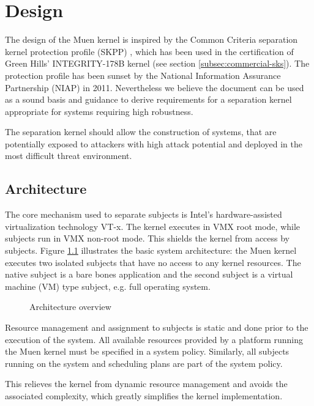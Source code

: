 \chapter{Design}
The design of the Muen kernel is inspired by the Common Criteria separation
kernel protection profile (SKPP) \cite{SKPP}, which has been used in the
certification of Green Hills' INTEGRITY-178B kernel (see section
\ref{subsec:commercial-sks}). The protection profile has been sunset by the
National Information Assurance Partnership (NIAP) in 2011. Nevertheless we
believe the document can be used as a sound basis and guidance to derive
requirements for a separation kernel appropriate for systems requiring high
robustness.

The separation kernel should allow the construction of systems, that are
potentially exposed to attackers with high attack potential and deployed in the
most difficult threat environment.







\section{Architecture}
The core mechanism used to separate subjects is Intel's hardware-assisted
virtualization technology VT-x. The kernel executes in VMX root mode, while
subjects run in VMX non-root mode. This shields the kernel from access by
subjects. Figure \ref{fig:architecture-overview} illustrates the basic system
architecture: the Muen kernel executes two isolated subjects that have no access
to any kernel resources. The native subject is a bare bones application and the
second subject is a virtual machine (VM) type subject, e.g. full operating
system.

\begin{figure}[h]
	\centering
	
	\caption{Architecture overview}
	\label{fig:architecture-overview}
\end{figure}

Resource management and assignment to subjects is static and done prior to the
execution of the system. All available resources provided by a platform running
the Muen kernel must be specified in a system policy. Similarly, all subjects
running on the system and scheduling plans are part of the system policy.

This relieves the kernel from dynamic resource management and avoids the
associated complexity, which greatly simplifies the kernel implementation.

